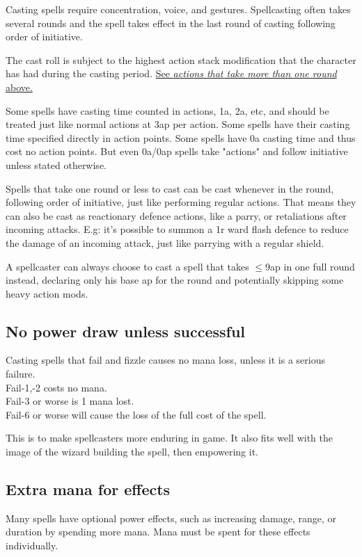 Casting spells require concentration, voice, and gestures. Spellcasting often takes several rounds and the spell takes effect in the last round of casting following order of initiative.

The cast roll is subject to the highest action stack modification that the character has had during the casting period. \hyperref[multiroundactions]{See \emph{actions that take more than one round} above.}

Some spells have casting time counted in actions, 1a, 2a, etc, and should be treated just like normal actions at 3ap per action. Some spells have their casting time specified directly in action points. Some spells have 0a casting time and thus cost no action points. But even 0a/0ap spells take "actions" and follow initiative unless stated otherwise.

Spells that take one round or less to cast can be cast whenever in the round, following order of initiative, just like performing regular actions. That means they can also be cast as reactionary defence actions, like a parry, or retaliations after incoming attacks.
E.g: it's possible to summon a 1r ward flash defence to reduce the damage of an incoming attack, just like parrying with a regular shield.

A spellcaster can always choose to cast a spell that takes $\le$9ap in one full round instead, declaring only his base ap for the round and potentially skipping some heavy action mods.


\subsection*{No power draw unless successful}
Casting spells that fail and fizzle causes no mana loss, unless it is a serious failure.\\
Fail-1,-2 costs no mana. \\
Fail-3 or worse is 1 mana lost. \\
Fail-6 or worse will cause the loss of the full cost of the spell.

This is to make spellcasters more enduring in game. It also fits well with the image of the wizard building the spell, then empowering it.


\subsection*{Extra mana for effects}
Many spells have optional power effects, such as increasing damage, range, or duration by spending more mana. Mana must be spent for these effects individually.

